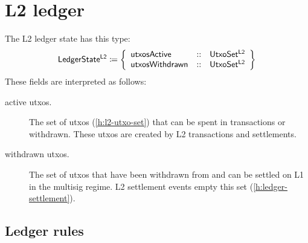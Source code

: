 \documentclass[../hydrozoa.tex]{subfiles}
\begin{document}
\chapter{L2 ledger}%
\label{h:l2-ledger}%

The L2 ledger state has this type:
\begin{equation*}
  \mathsf{LedgerState^{L2}} \coloneq \left\{
  \begin{array}{lll}
    \mathsf{utxosActive} &::& \mathsf{UtxoSet^{L2}} \\
    \mathsf{utxosWithdrawn} &::& \mathsf{UtxoSet^{L2}}
  \end{array}\right\}
\end{equation*}
These fields are interpreted as follows:
\begin{description}
  \item[active utxos.] The set of utxos (\cref{h:l2-utxo-set}) that can be spent in transactions or withdrawn.
    These utxos are created by L2 transactions and settlements.
  \item[withdrawn utxos.] The set of utxos that have been withdrawn from  and can be settled on L1 in the multisig regime.
    L2 settlement events empty this set (\cref{h:ledger-settlement}).
    
\end{description}

\section{Ledger rules}%
\label{h:l2-ledger-rules}%
\end{document}
